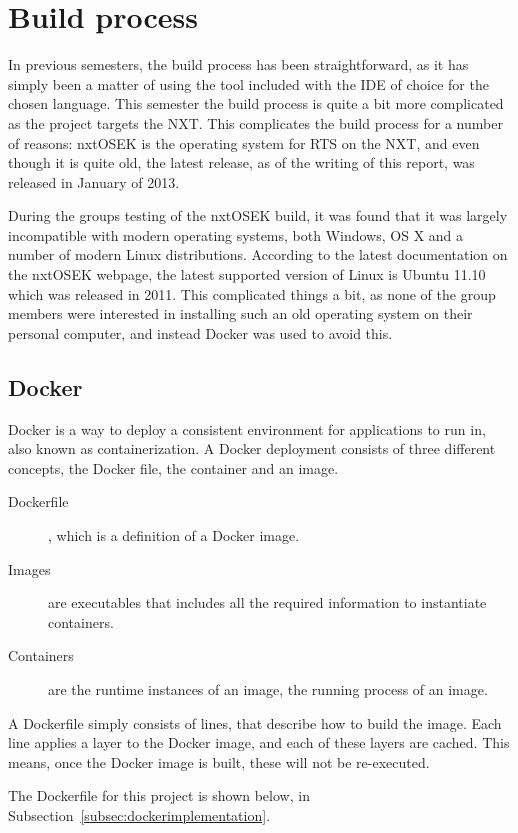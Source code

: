 \section{Build process}\label{sec:buildprocess}
In previous semesters, the build process has been straightforward, as it has simply been a matter of using the tool included with the IDE of choice for the chosen language.
This semester the build process is quite a bit more complicated as the project targets the NXT.
This complicates the build process for a number of reasons:
nxtOSEK is the operating system for RTS on the NXT, and even though it is quite old, the latest release, as of the writing of this report, was released in January of 2013\cite{osekrelease}.

During the groups testing of the nxtOSEK build, it was found that it was largely incompatible with modern operating systems, both Windows, OS X and a number of modern Linux distributions.
According to the latest documentation on the nxtOSEK webpage, the latest supported version of Linux is Ubuntu 11.10 which was released in 2011.
This complicated things a bit, as none of the group members were interested in installing such an old operating system on their personal computer, and instead Docker was used to avoid this.

\subsection{Docker}\label{subsec:docker}
Docker is a way to deploy a consistent environment for applications to run in, also known as containerization\cite{dockerdocstart}.
A Docker deployment consists of three different concepts, the Docker file, the container and an image.
\begin{description}
    \item [Dockerfile], which is a definition of a Docker image.
    \item [Images] are executables that includes all the required information to instantiate containers.
    \item[Containers] are the runtime instances of an image, the running process of an image.
\end{description}

A Dockerfile simply consists of lines, that describe how to build the image.
Each line applies a layer to the Docker image, and each of these layers are cached.
This means, once the Docker image is built, these will not be re-executed.

The Dockerfile for this project is shown below, in Subsection~\ref{subsec:dockerimplementation}.

